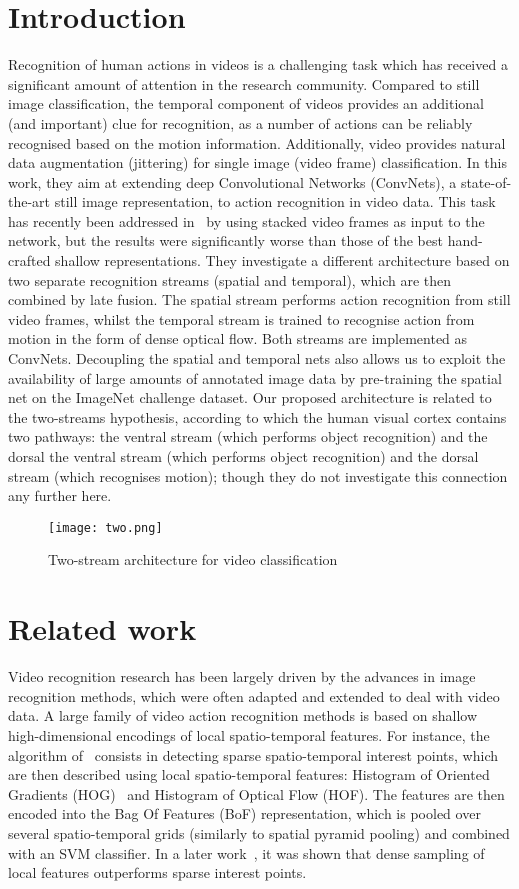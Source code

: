 \documentclass[10pt,twocolumn,letterpaper]{article}
\begin{document}
\section{Introduction}
Recognition of human actions in videos is a challenging task which has received a significant amount of attention in the research community. Compared to still image classification, the temporal component of videos provides an additional (and important) clue for recognition, as a
number of actions can be reliably recognised based on the motion information. Additionally, video provides natural data augmentation (jittering) for single image (video frame) classification.
In this work, they aim at extending deep Convolutional Networks (ConvNets), a state-of-the-art still image representation, to action recognition in video data. This task has recently been
addressed in~\cite{name15} by using stacked video frames as input to the network, but the results were significantly worse than those of the best hand-crafted shallow representations. They investigate
a different architecture based on two separate recognition streams (spatial and temporal), which are then combined by late fusion. The spatial stream performs action recognition from still video
frames, whilst the temporal stream is trained to recognise action from motion in the form of dense optical flow. Both streams are implemented as ConvNets. Decoupling the spatial and temporal nets
also allows us to exploit the availability of large amounts of annotated image data by pre-training the spatial net on the ImageNet challenge dataset. Our proposed architecture is related to the
two-streams hypothesis, according to which the human visual cortex contains two pathways: the ventral stream (which performs object recognition) and the dorsal the ventral stream (which performs object recognition) and the dorsal stream (which recognises motion);
though they do not investigate this connection any further here.
\begin{figure}[!htb]
	\centering
	\texttt{[image: two.png]}\\
	\caption{Two-stream architecture for video classification}\label{Figure1}
\end{figure}
\section{Related work}
Video recognition research has been largely driven by the advances in image recognition methods, which were often adapted and extended to deal with video data. A large family of video action recognition methods is based on shallow high-dimensional encodings of local spatio-temporal features. For instance, the algorithm of~\cite{name17} consists in detecting sparse spatio-temporal interest points, which are then described using local spatio-temporal features: Histogram of Oriented Gradients (HOG)~\cite{name7} and Histogram of Optical Flow (HOF). The features are then encoded into the Bag Of Features (BoF) representation, which is pooled over several spatio-temporal grids (similarly to spatial pyramid pooling) and combined with an SVM classifier. In a later work~\cite{name28}, it was shown that dense sampling of local features outperforms sparse interest points.
\end{document}
